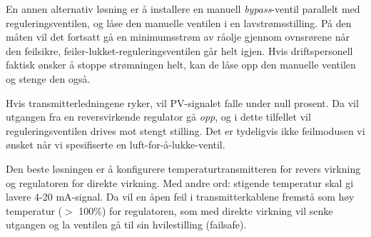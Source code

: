 En annen alternativ løsning er å installere en manuell {\it bypass}-ventil parallelt med reguleringsventilen, og låse den manuelle ventilen i en lavstrømsstilling. På den måten vil det fortsatt gå en minimumsstrøm av råolje gjennom ovnsrørene når den feilsikre, feiler-lukket-reguleringsventilen går helt igjen. Hvis driftspersonell faktisk ønsker å stoppe strømningen helt, kan de låse opp den manuelle ventilen og stenge den også.

\vskip 10pt

Hvis transmitterledningene ryker, vil PV-signalet falle under null prosent. Da vil utgangen fra en reversvirkende regulator gå {\it opp}, og i dette tilfellet vil reguleringsventilen drives mot stengt stilling. Det er tydeligvis ikke feilmodusen vi ønsket når vi spesifiserte en luft-for-å-lukke-ventil.

Den beste løsningen er å konfigurere temperaturtransmitteren for revers virkning og regulatoren for direkte virkning. Med andre ord: stigende temperatur skal gi lavere 4-20 mA-signal. Da vil en åpen feil i transmitterkablene fremstå som høy temperatur ($>$ 100\%) for regulatoren, som med direkte virkning vil senke utgangen og la ventilen gå til sin hvilestilling (failsafe).









